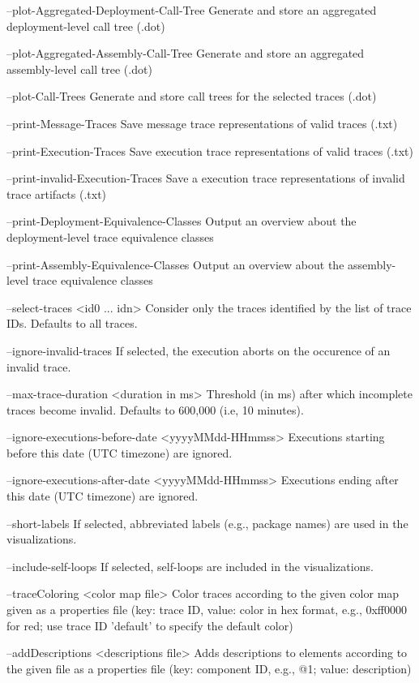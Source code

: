     --plot-Aggregated-Deployment-Call-Tree
        Generate and store an aggregated deployment-level call tree (.dot)

    --plot-Aggregated-Assembly-Call-Tree
        Generate and store an aggregated assembly-level call tree (.dot)

    --plot-Call-Trees
        Generate and store call trees for the selected traces (.dot)

    --print-Message-Traces
        Save message trace representations of valid traces (.txt)

    --print-Execution-Traces
        Save execution trace representations of valid traces (.txt)

    --print-invalid-Execution-Traces
        Save a execution trace representations of invalid trace artifacts (.txt)

    --print-Deployment-Equivalence-Classes
        Output an overview about the deployment-level trace equivalence classes

    --print-Assembly-Equivalence-Classes
        Output an overview about the assembly-level trace equivalence classes

    --select-traces <id0 ... idn>
        Consider only the traces identified by the list of trace IDs. Defaults
        to all traces.

    --ignore-invalid-traces
        If selected, the execution aborts on the occurence of an invalid trace.

    --max-trace-duration <duration in ms>
        Threshold (in ms) after which incomplete traces become invalid. Defaults
        to 600,000 (i.e, 10 minutes).

    --ignore-executions-before-date <yyyyMMdd-HHmmss>
        Executions starting before this date (UTC timezone) are ignored.

    --ignore-executions-after-date <yyyyMMdd-HHmmss>
        Executions ending after this date (UTC timezone) are ignored.

    --short-labels
        If selected, abbreviated labels (e.g., package names) are used in the
        visualizations.

    --include-self-loops
        If selected, self-loops are included in the visualizations.

    --traceColoring <color map file>
        Color traces according to the given color map given as a properties file
        (key: trace ID, value: color in hex format, e.g., 0xff0000 for red; use
        trace ID 'default' to specify the default color)

    --addDescriptions <descriptions file>
        Adds descriptions to elements according to the given file as a
        properties file (key: component ID, e.g., @1; value: description)